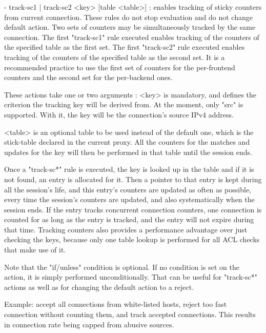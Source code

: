     - { track-sc1 | track-sc2 } <key> [table <table>] :
        enables tracking of sticky counters from current connection. These
        rules do not stop evaluation and do not change default action. Two sets
        of counters may be simultaneously tracked by the same connection. The
        first "track-sc1" rule executed enables tracking of the counters of the
        specified table as the first set. The first "track-sc2" rule executed
        enables tracking of the counters of the specified table as the second
        set. It is a recommended practice to use the first set of counters for
        the per-frontend counters and the second set for the per-backend ones.

        These actions take one or two arguments :
          <key>   is mandatory, and defines the criterion the tracking key will
                  be derived from. At the moment, only "src" is supported. With
                  it, the key will be the connection's source IPv4 address.

         <table>  is an optional table to be used instead of the default one,
                  which is the stick-table declared in the current proxy. All
                  the counters for the matches and updates for the key will
                  then be performed in that table until the session ends.

        Once a "track-sc*" rule is executed, the key is looked up in the table
        and if it is not found, an entry is allocated for it. Then a pointer to
        that entry is kept during all the session's life, and this entry's
        counters are updated as often as possible, every time the session's
        counters are updated, and also systematically when the session ends.
        If the entry tracks concurrent connection counters, one connection is
        counted for as long as the entry is tracked, and the entry will not
        expire during that time. Tracking counters also provides a performance
        advantage over just checking the keys, because only one table lookup is
        performed for all ACL checks that make use of it.

  Note that the "if/unless" condition is optional. If no condition is set on
  the action, it is simply performed unconditionally. That can be useful for
  "track-sc*" actions as well as for changing the default action to a reject.

  Example: accept all connections from white-listed hosts, reject too fast
           connection without counting them, and track accepted connections.
           This results in connection rate being capped from abusive sources.

